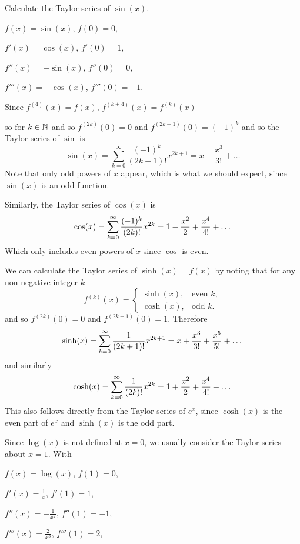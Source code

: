 \documentclass[10pt, a4paper]{article}
\begin{document}
\begin{example}
    Calculate the Taylor series of $\sin(x)$.

    $f(x) = \sin(x)$,
    $f(0) = 0$,
    
    $f'(x) = \cos(x)$,
    $f'(0) = 1$,

    $f''(x) = -\sin(x)$,
    $f''(0) = 0$,
    
    $f'''(x) = -\cos(x)$,
    $f'''(0) = -1$.

    Since $f ^ {(4)}(x) = f(x)$,
    $f ^ {(k + 4)}(x) = f ^ {(k)}(x)$

    so for $k \in \N$ and so $f ^ {(2k)}(0) = 0$ and
    $f ^ {(2k + 1)}(0) = (-1) ^ k$
    and so the Taylor series of $\sin$ is
    \[
    \sin(x) = \sum_{k = 0}^{\infty}\frac{(-1) ^ k}{(2k + 1)!}x ^ {2k + 1} = x - \frac{x ^ 3}{3!} + \dotsc
    \]
    Note that only odd powers of $x$ appear,
    which is what we should expect,
    since $\sin(x)$ is an odd function.

    Similarly,
    the Taylor series of $\cos(x)$ is
    \[
    \cos(x) = \infsum[k = 0]\frac{(-1) ^ {k}}{(2k)!}x ^ {2k} = 1 - \frac{x ^ 2}{2} + \frac{x ^ 4}{4!} + \dotsc
    \]
    Which only includes even powers of $x$ since $\cos$ is even.
\end{example}

We can calculate the Taylor series of $\sinh(x) = f(x)$ by noting that for any non-negative integer $k$
\[
f ^ {(k)}(x) = \begin{cases}
    \sinh(x), & \text{even } k, \\
    \cosh(x), & \text{odd } k.
\end{cases}
\]
and so $f ^ {(2k)}(0) = 0$ and $f ^ {(2k + 1)}(0) = 1$.
Therefore
\[
\sinh(x) = \infsum[k = 0]\frac{1}{(2k + 1)!}x ^ {2k + 1} = x + \frac{x ^ 3}{3!} + \frac{x ^ 5}{5!} + \dotsc
\]
and similarly
\[
\cosh(x) = \infsum[k = 0]\frac{1}{(2k)!}x ^ {2k} = 1 + \frac{x ^ 2}{2} + \frac{x ^ 4}{4!} + \dotsc
\]
This also follows directly from the Taylor series of $e ^ x$,
since $\cosh(x)$ is the even part of $e ^ x$ and $\sinh(x)$ is the odd part.

Since $\log(x)$ is not defined at $x = 0$,
we usually consider the Taylor series about $x = 1$.
With

$f(x) = \log(x)$,
$f(1) = 0$,

$f'(x) = \frac{1}{x}$,
$f'(1) = 1$,

$f''(x) = -\frac{1}{x ^ 2}$,
$f''(1) = -1$,

$f'''(x) = \frac{2}{x ^ 3}$,
$f'''(1) = 2$,
\end{document}
